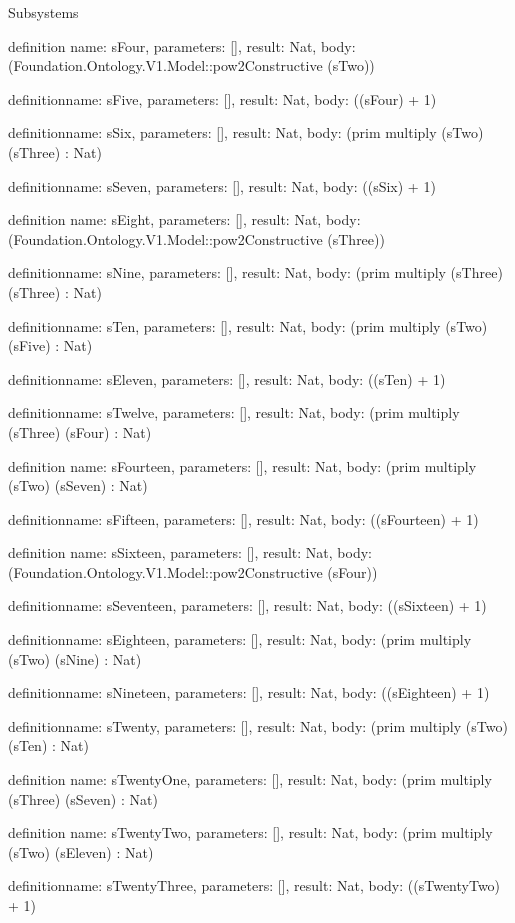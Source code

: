 \begin{lexlean}{Subsystems}
\begin{semanticmodule}
definition{
  name: sFour,
  parameters: [],
  result: Nat,
  body: (Foundation.Ontology.V1.Model::pow2Constructive (sTwo))
}

definition{name: sFive, parameters: [], result: Nat, body: ((sFour) + 1)}

definition{name: sSix, parameters: [], result: Nat, body: (prim multiply (sTwo) (sThree) : Nat)}

definition{name: sSeven, parameters: [], result: Nat, body: ((sSix) + 1)}

definition{
  name: sEight,
  parameters: [],
  result: Nat,
  body: (Foundation.Ontology.V1.Model::pow2Constructive (sThree))
}

definition{name: sNine, parameters: [], result: Nat, body: (prim multiply (sThree) (sThree) : Nat)}

definition{name: sTen, parameters: [], result: Nat, body: (prim multiply (sTwo) (sFive) : Nat)}

definition{name: sEleven, parameters: [], result: Nat, body: ((sTen) + 1)}

definition{name: sTwelve, parameters: [], result: Nat, body: (prim multiply (sThree) (sFour) : Nat)}

definition{
  name: sFourteen,
  parameters: [],
  result: Nat,
  body: (prim multiply (sTwo) (sSeven) : Nat)
}

definition{name: sFifteen, parameters: [], result: Nat, body: ((sFourteen) + 1)}

definition{
  name: sSixteen,
  parameters: [],
  result: Nat,
  body: (Foundation.Ontology.V1.Model::pow2Constructive (sFour))
}

definition{name: sSeventeen, parameters: [], result: Nat, body: ((sSixteen) + 1)}

definition{name: sEighteen, parameters: [], result: Nat, body: (prim multiply (sTwo) (sNine) : Nat)}

definition{name: sNineteen, parameters: [], result: Nat, body: ((sEighteen) + 1)}

definition{name: sTwenty, parameters: [], result: Nat, body: (prim multiply (sTwo) (sTen) : Nat)}

definition{
  name: sTwentyOne,
  parameters: [],
  result: Nat,
  body: (prim multiply (sThree) (sSeven) : Nat)
}

definition{
  name: sTwentyTwo,
  parameters: [],
  result: Nat,
  body: (prim multiply (sTwo) (sEleven) : Nat)
}

definition{name: sTwentyThree, parameters: [], result: Nat, body: ((sTwentyTwo) + 1)}


\end{semanticmodule}
\end{lexlean}
